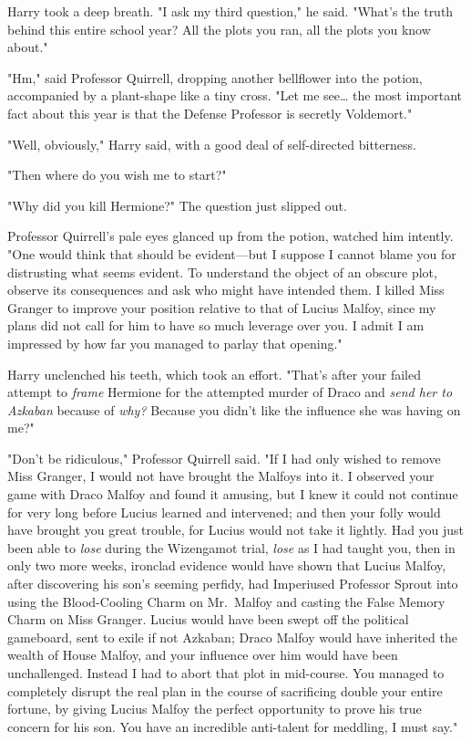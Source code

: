 Harry took a deep breath. "I ask my third question," he said. "What's the truth 
behind this entire school year? All the plots you ran, all the plots you know 
about."

"Hm," said Professor Quirrell, dropping another bellflower into the potion, 
accompanied by a plant-shape like a tiny cross. "Let me see{\ldots} the most 
important fact about this year is that the Defense Professor is secretly 
Voldemort."

"Well, obviously," Harry said, with a good deal of self-directed bitterness.

"Then where do you wish me to start?"

"Why did you kill Hermione?" The question just slipped out.

Professor Quirrell's pale eyes glanced up from the potion, watched him 
intently. "One would think that should be evident---but I suppose I cannot 
blame you for distrusting what seems evident. To understand the object of an 
obscure plot, observe its consequences and ask who might have intended them. I 
killed Miss Granger to improve your position relative to that of Lucius Malfoy, 
since my plans did not call for him to have so much leverage over you. I admit 
I am impressed by how far you managed to parlay that opening."

Harry unclenched his teeth, which took an effort. "That's after your failed 
attempt to \emph{frame} Hermione for the attempted murder of Draco and 
\emph{send her to Azkaban} because of \emph{why?} Because you didn't like the 
influence she was having on me?"

"Don't be ridiculous," Professor Quirrell said. "If I had only wished to remove 
Miss Granger, I would not have brought the Malfoys into it. I observed your 
game with Draco Malfoy and found it amusing, but I knew it could not continue 
for very long before Lucius learned and intervened; and then your folly would 
have brought you great trouble, for Lucius would not take it lightly. Had you 
just been able to \emph{lose} during the Wizengamot trial, \emph{lose} as I had 
taught you, then in only two more weeks, ironclad evidence would have shown 
that Lucius Malfoy, after discovering his son's seeming perfidy, had Imperiused 
Professor Sprout into using the Blood-Cooling Charm on Mr.~Malfoy and casting 
the False Memory Charm on Miss Granger. Lucius would have been swept off the 
political gameboard, sent to exile if not Azkaban; Draco Malfoy would have 
inherited the wealth of House Malfoy, and your influence over him would have 
been unchallenged. Instead I had to abort that plot in mid-course. You managed 
to completely disrupt the real plan in the course of sacrificing double your 
entire fortune, by giving Lucius Malfoy the perfect opportunity to prove his 
true concern for his son. You have an incredible anti-talent for meddling, I 
must say."

